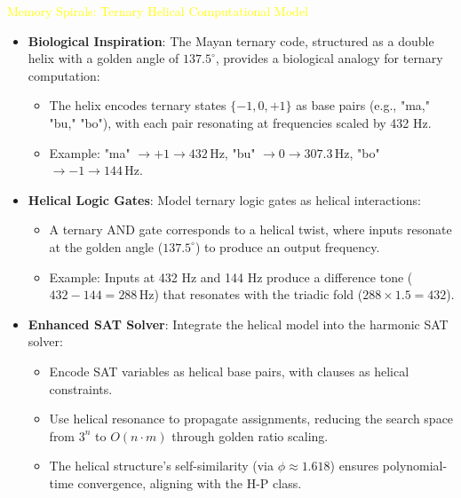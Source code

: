 \textcolor{yellow}{ Memory Spirals: Ternary Helical Computational Model } \\
\begin{itemize}
    \item \texttt{} \textbf{Biological Inspiration}: The Mayan ternary code, structured as a double helix with a golden angle of \(137.5^\circ\), provides a biological analogy for ternary computation:
    \begin{itemize}
        \item The helix encodes ternary states \(\{-1, 0, +1\}\) as base pairs (e.g., "ma," "bu," "bo"), with each pair resonating at frequencies scaled by 432 Hz.
        \item Example: "ma" \(\rightarrow +1 \rightarrow 432 \, \text{Hz}\), "bu" \(\rightarrow 0 \rightarrow 307.3 \, \text{Hz}\), "bo" \(\rightarrow -1 \rightarrow 144 \, \text{Hz}\).
    \end{itemize}
    \item \texttt{} \textbf{Helical Logic Gates}: Model ternary logic gates as helical interactions:
    \begin{itemize}
        \item A ternary AND gate corresponds to a helical twist, where inputs resonate at the golden angle (\(137.5^\circ\)) to produce an output frequency.
        \item Example: Inputs at 432 Hz and 144 Hz produce a difference tone (\(432 - 144 = 288 \, \text{Hz}\)) that resonates with the triadic fold (\(288 \times 1.5 = 432\)).
    \end{itemize}
    \item \texttt{} \textbf{Enhanced SAT Solver}: Integrate the helical model into the harmonic SAT solver:
    \begin{itemize}
        \item Encode SAT variables as helical base pairs, with clauses as helical constraints.
        \item Use helical resonance to propagate assignments, reducing the search space from \(3^n\) to \(O(n \cdot m)\) through golden ratio scaling.
        \item The helical structure’s self-similarity (via \(\phi \approx 1.618\)) ensures polynomial-time convergence, aligning with the H-P class.
    \end{itemize}
\end{itemize}

